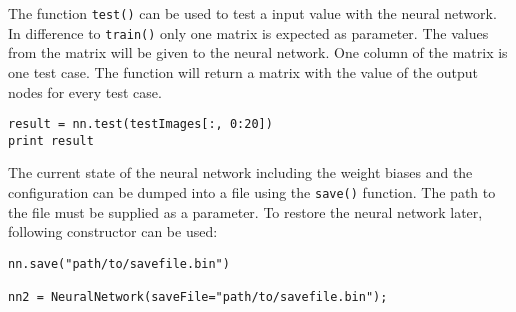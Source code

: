 \documentclass{acm_proc_article-sp}
\begin{document}
The function \texttt{test()} can be used to test a input value with the neural network. In difference to \texttt{train()} only one matrix is expected as parameter. The values from the matrix will be given to the neural network. One column of the matrix is one test case. The function will return a matrix with the value of the output nodes for every test case.

\lstset{language=Python}
\begin{lstlisting}[caption=Usage of test()]
result = nn.test(testImages[:, 0:20])
print result
\end{lstlisting}


The current state of the neural network including the weight biases and the configuration can be dumped into a file using the \texttt{save()} function. The path to the file must be supplied as a parameter. To restore the neural network later, following constructor can be used:
\lstset{language=Python}
\begin{lstlisting}[caption=Constructor to load a dump file]
nn.save("path/to/savefile.bin")

nn2 = NeuralNetwork(saveFile="path/to/savefile.bin");
\end{lstlisting}



\newpage

 

\balancecolumns
\end{document}
